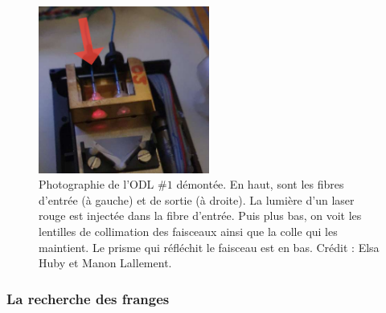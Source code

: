 \begin{figure}[ht!]
    \centering
    \includegraphics[width=0.5\textwidth]{Figure_Chap2/ODL_Inside_LightInjected_02.png}
    \caption[Photographie d'une ODL démontée.]{Photographie de l'ODL $\#1$ démontée. En haut, sont les fibres d'entrée (à gauche) et de sortie (à droite). La lumière d'un laser rouge est injectée dans la fibre d'entrée. Puis plus bas, on voit les lentilles de collimation des faisceaux ainsi que la colle qui les maintient. Le prisme qui réfléchit le faisceau est en bas. Crédit : Elsa Huby et Manon Lallement.}
    \label{fig:ODLOpened}
\end{figure}


\subsubsection{La recherche des franges}


